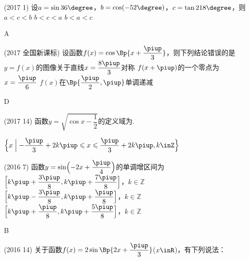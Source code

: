     \begin{exercise}
      \item%
        (2017  1)
        设$a=\sin36\degree$，$b=\cos(-52\degree)$，$c=\tan218\degree$，则\xz
         {$a<c<b$}
         {$b<c<a$}
         {$b<a<c$}
        \begin{answer}
          A
        \end{answer}
      \item%
          {\kaishu (2017 \textbullet 全国新课标)}
          设函数$f(x)=\cos\Bp{x+\dfrac{\piup}3}$，则下列结论错误的是\xz
           {$y=f(x)$的图像关于直线$x=\dfrac{8\piup}3$对称}
           {$f(x+\piup)$的一个零点为$x=\dfrac{\piup}6$}
           {$f(x)$在$\Bp{\dfrac{\piup}2,\piup}$单调递减}
          \begin{answer}
            D
          \end{answer}
      \item%
        (2017  14)
        函数$y=\sqrt{\cos x-\dfrac12}$的定义域为\tk.
        \begin{answer}
          $\Bigl\{x\Bigm | -\dfrac{\piup}3+2k\piup\leqslant x\leqslant \dfrac{\piup}3+2k\piup,k\inZ \Bigr\}$
        \end{answer}
      \item%
        (2016  7)
        函数$y=\sin\Bigl(-2x+\dfrac{\piup}4 \Bigr)$的单调增区间为\xz
         {$\Bigl[k\piup+\dfrac{3\piup}8,k\piup+\dfrac{7\piup}8 \Bigr]$，$k\in\mathbb{Z}$}
         {$\Bigl[k\piup-\dfrac{3\piup}8,k\piup+\dfrac{\piup}8 \Bigr]$，$k\in\mathbb{Z}$}
         {$\Bigl[k\piup+\dfrac{\piup}8,k\piup+\dfrac{5\piup}8 \Bigr]$，$k\in\mathbb{Z}$}
        \begin{answer}
          B
        \end{answer}
      \item%
        (2016  14)
        关于函数$f(x)=2\sin\Bp{2x+\dfrac{\piup}3}$($x\inR$)，有下列说法：\\

\end{exercise}
